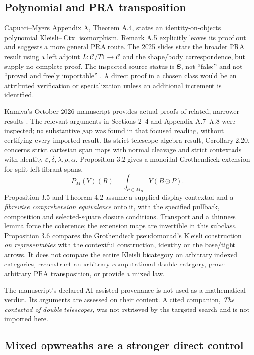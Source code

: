 \documentclass[11pt,a4paper]{article}
\newcommand{\Ctx}{\operatorname{Ctx}}
\newcommand{\C}{\mathcal C}
\begin{document}
\subsection{Polynomial and PRA transposition}

Capucci--Myers Appendix A, Theorem A.4, states an identity-on-objects
polynomial Kleisli--\(\Ctx\) isomorphism. Remark A.5 explicitly leaves its proof
out and suggests a more general PRA route. The 2025 slides state the broader
PRA result using a left adjoint \(L:\C/T1\to\C\) and the shape/body
correspondence, but supply no complete proof. The inspected source status is
\textbf{S}, not ``false'' and not ``proved and freely importable''
\cite{CM,Slides}. A direct proof in a chosen class would be an attributed
verification or specialization unless an additional increment is identified.

Kamiya's October 2026 manuscript provides actual proofs of related, narrower
results \cite{Kamiya}. The relevant arguments in Sections 2--4 and Appendix
A.7--A.8 were inspected; no substantive gap was found in that focused reading,
without certifying every imported result. Its strict telescope-algebra result,
Corollary 2.20, concerns strict cartesian span maps with normal cleavage and
strict contextads with identity \(\varepsilon,\delta,\lambda,\rho,\alpha\).
Proposition 3.2 gives a monoidal Grothendieck extension for split left-fibrant
spans,
\[
  P_M(Y)(B)=\int_{P\in M_B}Y(B\mathbin{\odot}P).
\]
Proposition 3.5 and Theorem 4.2 assume a supplied display contextad and a
\emph{fibrewise comprehension equivalence} onto it, with the specified pullback,
composition and selected-square closure conditions. Transport and a thinness
lemma force the coherence; the extension maps are invertible in this subclass.
Proposition 3.6 compares the Grothendieck pseudomonad's Kleisli construction
\emph{on representables} with the contextful construction, identity on the
base/tight arrows. It does not compare the entire Kleisli bicategory on arbitrary
indexed categories, reconstruct an arbitrary computational double category,
prove arbitrary PRA transposition, or provide a mixed law.

The manuscript's declared AI-assisted provenance is not used as a mathematical
verdict. Its arguments are assessed on their content. A cited companion,
\emph{The contextad of double telescopes}, was not retrieved by the targeted
search and is not imported here.

\subsection{Mixed opwreaths are a stronger direct control}
\end{document}

